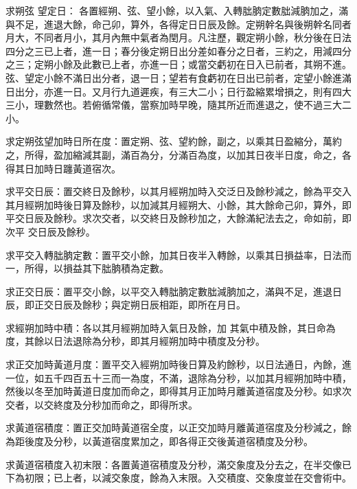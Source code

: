 \begin{pinyinscope}
 求朔弦
 望定日：
 各置經朔、弦、望小餘，以入氣、入轉朏朒定數朏減朒加之，滿與不足，進退大餘，命己卯，算外，各得定日日辰及餘。定朔幹名與後朔幹名同者月大，不同者月小，其月內無中氣者為閏月。凡注歷，觀定朔小餘，秋分後在日法四分之三已上者，進一日；春分後定朔日出分差如春分之日者，三約之，用減四分之三；定朔小餘及此數已上者，亦進一日；或當交虧初在日入已前者，其朔不進。弦、望定小餘不滿日出分者，退一日；望若有食虧初在日出已前者，定望小餘進滿日出分，亦進一日。又月行九道遲疾，有三大二小；日行盈縮累增損之，則有四大三小，理數然也。若俯循常儀，當察加時早晚，隨其所近而進退之，使不過三大二小。



 求定朔弦望加時日所在度：置定朔、弦、望約餘，副之，以乘其日盈縮分，萬約之，所得，盈加縮減其副，滿百為分，分滿百為度，以加其日夜半日度，命之，各得其日加時日躔黃道宿次。



 求平交日辰：置交終日及餘秒，以其月經朔加時入交泛日及餘秒減之，餘為平交入其月經朔加時後日算及餘秒，以加減其月經朔大、小餘，其大餘命己卯，算外，即平交日辰及餘秒。求次交者，以交終日及餘秒加之，大餘滿紀法去之，命如前，即次平
 交日辰及餘秒。



 求平交入轉朏朒定數：置平交小餘，加其日夜半入轉餘，以乘其日損益率，日法而一，所得，以損益其下朏朒積為定數。



 求正交日辰：置平交小餘，以平交入轉朏朒定數朏減朒加之，滿與不足，進退日辰，即正交日辰及餘秒；與定朔日辰相距，即所在月日。



 求經朔加時中積：各以其月經朔加時入氣日及餘，加
 其氣中積及餘，其日命為度，其餘以日法退除為分秒，即其月經朔加時中積度及分秒。



 求正交加時黃道月度：置平交入經朔加時後日算及約餘秒，以日法通日，內餘，進一位，如五千四百五十三而一為度，不滿，退除為分秒，以加其月經朔加時中積，然後以冬至加時黃道日度加而命之，即得其月正加時月離黃道宿度及分秒。如求次交者，以交終度及分秒加而命之，即得所求。



 求黃道宿積度：置正交加時黃道宿全度，以正交加時月離黃道宿度及分秒減之，餘為距後度及分秒，以黃道宿度累加之，即各得正交後黃道宿積度及分秒。



 求黃道宿積度入初末限：各置黃道宿積度及分秒，滿交象度及分去之，在半交像已下為初限；已上者，以減交象度，餘為入末限。入交積度、交象度並在交會術中。




\end{pinyinscope}
